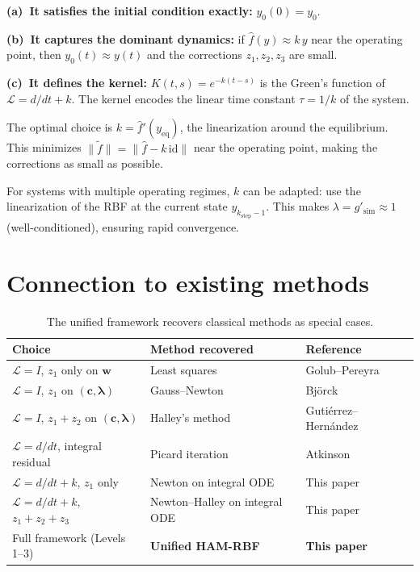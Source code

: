 \documentclass[11pt,a4paper]{article}
\begin{document}
\textbf{(a)~It satisfies the initial condition exactly:} $y_0(0) = y_0$.

\textbf{(b)~It captures the dominant dynamics:} if $\hat{f}(y) \approx k\,y$ near the operating point, then $y_0(t) \approx y(t)$ and the corrections $z_1, z_2, z_3$ are small.

\textbf{(c)~It defines the kernel:} $K(t,s) = e^{-k(t-s)}$ is the Green's function of $\mathcal{L} = d/dt + k$. The kernel encodes the linear time constant $\tau = 1/k$ of the system.

The optimal choice is $k = \hat{f}'(y_{\mathrm{eq}})$, the linearization around the equilibrium. This minimizes $\|\tilde{f}\| = \|\hat{f} - k\,\mathrm{id}\|$ near the operating point, making the corrections as small as possible.

For systems with multiple operating regimes, $k$ can be adapted: use the linearization of the RBF at the current state $y_{k_{\mathrm{step}}-1}$. This makes $\lambda = g'_{\mathrm{sim}} \approx 1$ (well-conditioned), ensuring rapid convergence.


\section{Connection to existing methods}
\label{sec:connections}

\begin{table}[H]
\centering
\caption{The unified framework recovers classical methods as special cases.}
\label{tab:connections}
\begin{tabular}{L{4cm} L{3.5cm} L{5cm}}
\toprule
\textbf{Choice} & \textbf{Method recovered} & \textbf{Reference} \\
\midrule
$\mathcal{L} = I$, $z_1$ only on $\mathbf{w}$ & Least squares & Golub--Pereyra~\cite{GolubPereyra1973} \\
$\mathcal{L} = I$, $z_1$ on $(\mathbf{c}, \boldsymbol{\lambda})$ & Gauss--Newton & Bj\"orck~\cite{Bjorck1996} \\
$\mathcal{L} = I$, $z_1 + z_2$ on $(\mathbf{c}, \boldsymbol{\lambda})$ & Halley's method & Guti\'errez--Hern\'andez~\cite{Gutierrez1997} \\
$\mathcal{L} = d/dt$, integral residual & Picard iteration & Atkinson~\cite{Atkinson1997} \\
$\mathcal{L} = d/dt + k$, $z_1$ only & Newton on integral ODE & This paper \\
$\mathcal{L} = d/dt + k$, $z_1 + z_2 + z_3$ & Newton--Halley on integral ODE & This paper \\
Full framework (Levels 1--3) & \textbf{Unified HAM-RBF} & \textbf{This paper} \\
\bottomrule
\end{tabular}
\end{table}
\end{document}
